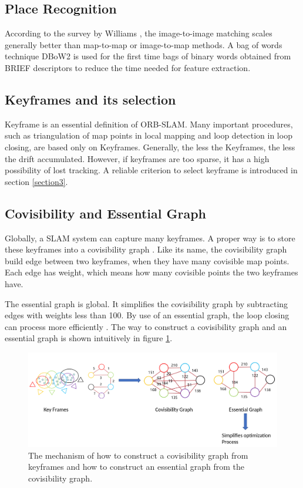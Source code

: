 \documentclass[letterpaper, 10 pt, conference]{ieeeconf}  %
\begin{document}
\subsection{Place Recognition}
According to the survey by Williams \cite{13}, the image-to-image matching scales generally better than map-to-map or image-to-map methods. A bag of words technique DBoW2 \cite{14} is used for the first time bags of binary words obtained from BRIEF descriptors to reduce the time needed for feature extraction. 

\subsection{Keyframes and its selection}
Keyframe is an essential definition of ORB-SLAM. Many important procedures, such as triangulation of map points in local mapping and loop detection in loop closing, are based only on Keyframes. Generally, the less the Keyframes, the less the drift accumulated. However, if keyframes are too sparse, it has a high possibility of lost tracking. A reliable criterion to select keyframe is introduced in section \ref{section3}.

\subsection{Covisibility and Essential Graph}
Globally, a SLAM system can capture many keyframes. A proper way is to store these keyframes into a covisibility graph \cite{7}. Like its name, the covisibility graph build edge between two keyframes, when they have many covisible map points. Each edge has weight, which means how many covisible points the two keyframes have.

The essential graph is global. It simplifies the covisibility graph by subtracting edges with weights less than 100. By use of an essential graph, the loop closing can process more efficiently \cite{6}. The way to construct a covisibility graph and an essential graph is shown intuitively in figure \ref{covisibility_essential_graph}.
%
\begin{figure}[!htbp]%
\centering
\includegraphics[scale=0.148]{./images/covisibility_essential_graph}
\caption{The mechanism of how to construct a covisibility graph from keyframes and how to construct an essential graph from the covisibility graph.}
\label{covisibility_essential_graph}
\end{figure}
%
\end{document}
